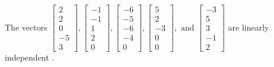 \begin{exercise}
\begin{exerciseStatement}
  \end{exerciseStatement}
  \begin{exerciseAnswer}
   The vectors \(\left[\begin{array}{r}
2 \\
2 \\
0 \\
-5 \\
3
\end{array}\right] , \left[\begin{array}{r}
-1 \\
-1 \\
1 \\
2 \\
0
\end{array}\right] , \left[\begin{array}{r}
-6 \\
-5 \\
-6 \\
-4 \\
0
\end{array}\right] , \left[\begin{array}{r}
5 \\
2 \\
-3 \\
0 \\
0
\end{array}\right] , \text{ and } \left[\begin{array}{r}
-3 \\
5 \\
3 \\
-1 \\
2
\end{array}\right]\) are 
  	 linearly independent  .
  


  \end{exerciseAnswer}
\end{exercise}